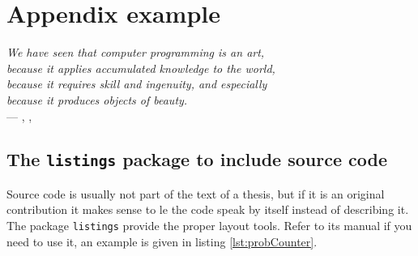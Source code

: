 \chapter{Appendix example}

\begin{flushright}{\slshape    
    We have seen that computer programming is an art, \\ 
    because it applies accumulated knowledge to the world, \\ 
    because it requires skill and ingenuity, and especially \\
    because it produces objects of beauty.} \\ \medskip
    --- \citeauthor{knuth:1974}, ,
\citeyear{knuth:1974} 
\end{flushright}

\section{The \texttt{listings} package to include source code}
Source code is usually not part of the text of a thesis, but if it is an original contribution it makes sense to le the code speak by itself instead of describing it. The package \verb!listings! provide the proper layout tools. Refer to its manual if you need to use it, an example is given in listing \ref{lst:probCounter}.

